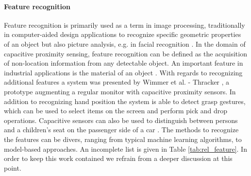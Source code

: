 \paragraph{Feature recognition}
Feature recognition is primarily used as a term in image processing, traditionally in computer-aided design applications to recognize specific geometric properties of an object but also picture analysis, e.g. in facial recognition \cite{han2000manufacturing,belhumeur1997eigenfaces}. 
In the domain of capacitive proximity sensing, feature recognition can be defined as the acquisition of non-location information from any detectable object. An important feature in industrial applications is the material of an object \cite{Baxter1996}. With regards to recognizing additional features a system was presented by Wimmer et al. - Thracker \cite{Wimmer2006}, a prototype augmenting a regular monitor with capacitive proximity sensors. In addition to recognizing hand position the system is able to detect grasp gestures, which can be used to select items on the screen and perform pick and drop operations. Capacitive sensors can also be used to distinguish between persons and a children’s seat on the passenger side of a car \cite{george2009seat}. 
The methods to recognize the features can be divers, ranging from typical machine learning algorithms, to model-based approaches. An incomplete list is given in Table \ref{tab:rel_feature}. In order to keep this work contained we refrain from a deeper discussion at this point.

